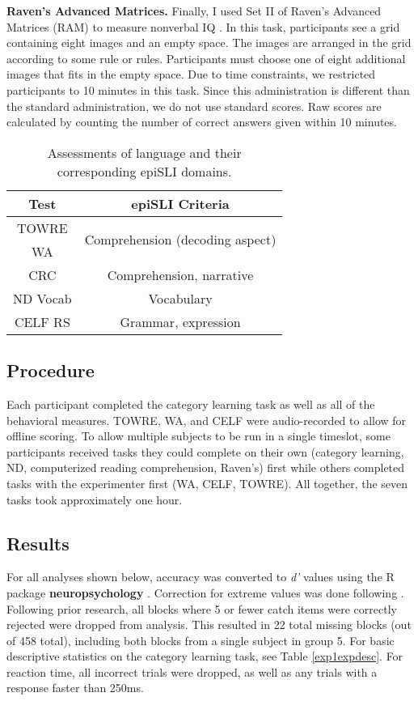 \documentclass[../dissertation.tex]{subfiles}
\begin{document}
	\textbf{Raven's Advanced Matrices.} Finally, I used Set II of Raven's Advanced Matrices (RAM) to measure nonverbal IQ \citep{Raven1998}. In this task, participants see a grid containing eight images and an empty space. The images are arranged in the grid according to some rule or rules. Participants must choose one of eight additional images that fits in the empty space. Due to time constraints, we restricted participants to 10 minutes in this task. Since this administration is different than the standard administration, we do not use standard scores. Raw scores are calculated by counting the number of correct answers given within 10 minutes.

\begin{table}[H]
\caption{Assessments of language and their corresponding epiSLI domains.}
\vspace{-10pt}
\begin{center}
\begin{tabular}{ c|c } 
 \hline 
 Test & epiSLI Criteria \\ 
 \hline
 TOWRE & \multirow{2}{*}{Comprehension (decoding aspect)}\\ 
 WA & \\ 
 CRC & Comprehension, narrative \\
 ND Vocab & Vocabulary \\ 
 CELF RS & Grammar, expression \\ 
 \hline
\end{tabular}
\end{center}
\label{slitable}
\end{table}


\subsection{Procedure}
	Each participant completed the category learning task as well as all of the behavioral measures. TOWRE, WA, and CELF were audio-recorded to allow for offline scoring. To allow multiple subjects to be run in a single timeslot, some participants received tasks they could complete on their own (category learning, ND, computerized reading comprehension, Raven's) first while others completed tasks with the experimenter first (WA, CELF, TOWRE). All together, the seven tasks took approximately one hour.
	
\subsection{Results}
	For all analyses shown below, accuracy was converted to \textit{d'} values \citep{macmillan2004} using the R package \textbf{neuropsychology} \citep{neuropsych}. Correction for extreme values was done following \citep{Hautus1995}. Following prior research, all blocks where 5 or fewer catch items were correctly rejected were dropped from analysis. This resulted in 22 total missing blocks (out of 458 total), including both blocks from a single subject in group 5. For basic descriptive statistics on the category learning task, see Table \ref{exp1expdesc}. For reaction time, all incorrect trials were dropped, as well as any trials with a response faster than 250ms.  \par
\end{document}
